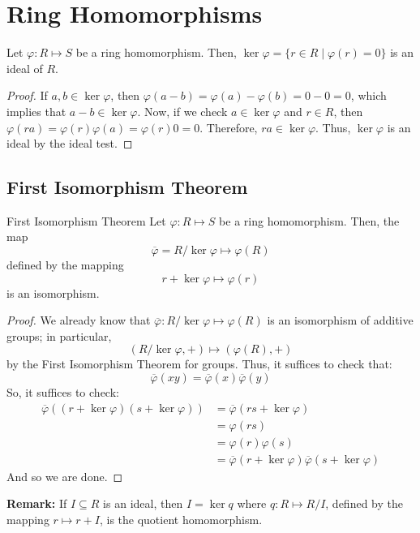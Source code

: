 \documentclass[letterpaper]{article}
\begin{document}
\section{Ring Homomorphisms}
\begin{theorem}{}{}
    Let $\varphi: R \mapsto S$ be a ring homomorphism. Then, $\ker \varphi = \{r \in R \mid \varphi(r) = 0\}$ is an ideal of $R$. 
\end{theorem}

\begin{mdframed}[]
    \begin{proof}
        If $a, b \in \ker \varphi$, then $\varphi(a - b) = \varphi(a) - \varphi(b) = 0 - 0 = 0$, which implies that $a - b \in \ker \varphi$. Now, if we check $a \in \ker \varphi$ and $r \in R$, then $\varphi(ra) = \varphi(r) \varphi(a) = \varphi(r) 0 = 0$. Therefore, $ra \in \ker \varphi$. Thus, $\ker \varphi$ is an ideal by the ideal test. 
    \end{proof}
\end{mdframed}


\subsection{First Isomorphism Theorem}
\begin{theorem}{First Isomorphism Theorem}{}
    Let $\varphi: R \mapsto S$ be a ring homomorphism. Then, the map
    \[\overline{\varphi} = R / \ker\varphi \mapsto \varphi(R)\]
    defined by the mapping
    \[r + \ker\varphi \mapsto \varphi(r)\]
    is an isomorphism.
\end{theorem}

\begin{mdframed}[]
    \begin{proof}
        We already know that $\overline{\varphi}: R / \ker \varphi \mapsto \varphi(R)$ is an isomorphism of additive groups; in particular,
        \[(R / \ker \varphi, +) \mapsto (\varphi(R), +)\]
        by the First Isomorphism Theorem for groups. Thus, it suffices to check that:
        \[\overline{\varphi}(xy) = \overline{\varphi}(x) \overline{\varphi}(y)\]
        So, it suffices to check:
        \begin{equation*}
            \begin{aligned}
                \overline{\varphi}((r + \ker\varphi)(s + \ker\varphi)) &= \overline{\varphi}(rs + \ker\varphi) \\ 
                    &= \varphi(rs) \\ 
                    &= \varphi(r)\varphi(s) \\ 
                    &= \overline{\varphi}(r + \ker\varphi) \overline{\varphi}(s + \ker\varphi)
            \end{aligned}
        \end{equation*}
        And so we are done. 
    \end{proof}
\end{mdframed}
\textbf{Remark:} If $I \subseteq R$ is an ideal, then $I = \ker q$ where $q: R \mapsto R / I$, defined by the mapping $r \mapsto r + I$, is the quotient homomorphism.
\end{document}
